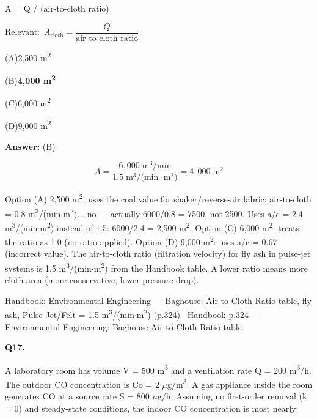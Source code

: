 \documentclass[11pt]{article}
\newcommand{\correct}[1]{\textbf{#1}\;{\color{accent}$\checkmark$}}
\newcommand{\optline}[2]{\par\noindent\hspace{1.2em}(#1)\hspace{0.6em}#2}
\begin{document}
A = Q / (air-to-cloth ratio)\par\vspace{3pt}
{\small\color{soft}Relevant:}\ $A_{\text{cloth}} = \dfrac{Q}{\text{air-to-cloth ratio}}$\par\vspace{3pt}
\optline{A}{2,500 m\textsuperscript{2}}
\optline{B}{\correct{4,000 m\textsuperscript{2}}}
\optline{C}{6,000 m\textsuperscript{2}}
\optline{D}{9,000 m\textsuperscript{2}}
\par\vspace{3pt}
\vspace{2pt}\par\noindent\colorbox{boxbg}{\parbox{\dimexpr\linewidth-2\fboxsep\relax}{%
\vspace{2pt}\textbf{Answer:} (B)\par\vspace{2pt}
{\small \[A = \frac{6{,}000\;\text{m}^3\text{/min}}{1.5\;\text{m}^3\text{/(min}\cdot\text{m}^2\text{)}} = 4{,}000\;\text{m}^2\]

Option (A) 2,500 m\textsuperscript{2}: uses the coal value for shaker/reverse-air fabric: air-to-cloth = 0.8 m\textsuperscript{3}/(min$\cdot$m\textsuperscript{2})... no --- actually 6000/0.8 = 7500, not 2500. Uses a/c = 2.4 m\textsuperscript{3}/(min$\cdot$m\textsuperscript{2}) instead of 1.5: 6000/2.4 = 2,500 m\textsuperscript{2}. Option (C) 6,000 m\textsuperscript{2}: treats the ratio as 1.0 (no ratio applied). Option (D) 9,000 m\textsuperscript{2}: uses a/c = 0.67 (incorrect value). The air-to-cloth ratio (filtration velocity) for fly ash in pulse-jet systems is 1.5 m\textsuperscript{3}/(min$\cdot$m\textsuperscript{2}) from the Handbook table. A lower ratio means more cloth area (more conservative, lower pressure drop).}\par\vspace{2pt}
{\footnotesize\color{soft}Handbook: Environmental Engineering --- Baghouse: Air-to-Cloth Ratio table, fly ash, Pulse Jet/Felt = 1.5 m\textsuperscript{3}/(min$\cdot$m\textsuperscript{2}) (p.324) \textbullet\ Handbook p.324 --- Environmental Engineering: Baghouse Air-to-Cloth Ratio table}\vspace{2pt}
}}
\vspace{9pt}
\filbreak
\textbf{\color{accent}Q17.}\par\vspace{2pt}
A laboratory room has volume V = 500 m\textsuperscript{3} and a ventilation rate Q = 200 m\textsuperscript{3}/h. The outdoor CO concentration is Co = 2 $\mu$g/m\textsuperscript{3}. A gas appliance inside the room generates CO at a source rate S = 800 $\mu$g/h. Assuming no first-order removal (k = 0) and steady-state conditions, the indoor CO concentration is most nearly:
\end{document}
